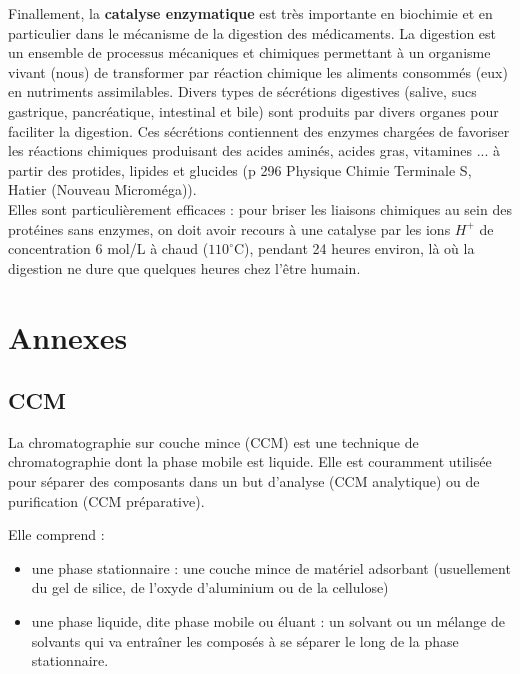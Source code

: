 \documentclass{article}
\begin{document}
Finallement, la \textbf{catalyse enzymatique} est très importante en biochimie et en particulier dans le mécanisme de la digestion des médicaments. La digestion est un ensemble de processus mécaniques et chimiques permettant à un organisme 	vivant (nous) de transformer par réaction chimique les aliments consommés (eux) en nutriments assimilables. Divers types de sécrétions digestives (salive, sucs gastrique, pancréatique, intestinal et bile) sont produits par divers organes pour faciliter la digestion. Ces sécrétions contiennent des enzymes chargées de favoriser les réactions chimiques produisant des acides aminés, acides gras, vitamines ... à partir des protides, lipides et glucides (p 296 Physique Chimie Terminale S, Hatier (Nouveau Microméga)).\\
	
	Elles sont particulièrement efficaces : pour briser les liaisons chimiques au sein des protéines sans enzymes, on doit avoir recours à une catalyse par les ions $H^+$ de concentration 6 mol/L à chaud ($110^\circ$C), pendant 24 heures environ, là où la digestion ne dure que quelques heures chez l'être humain.








\newpage
\section*{Annexes}

\subsection*{CCM}

La chromatographie sur couche mince (CCM) est une technique de chromatographie dont la phase mobile est liquide. Elle est couramment utilisée pour séparer des composants dans un but d'analyse (CCM analytique) ou de purification (CCM préparative).\medskip

Elle comprend :

\begin{itemize}
    \item une phase stationnaire : une couche mince de matériel adsorbant (usuellement du gel de silice, de l'oxyde d'aluminium ou de la cellulose)
    \item une phase liquide, dite phase mobile ou éluant : un solvant ou un mélange de solvants qui va entraîner les composés à se séparer le long de la phase stationnaire.
\end{itemize}
\end{document}
